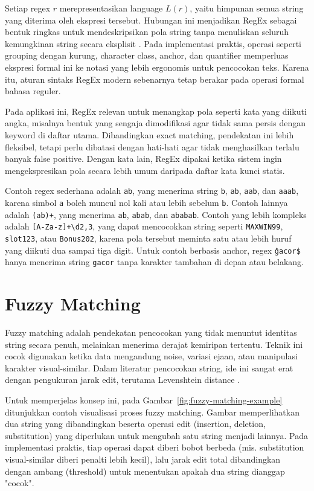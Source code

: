 Setiap regex $r$ merepresentasikan language $L(r)$, yaitu himpunan semua string yang diterima oleh ekspresi tersebut. Hubungan ini menjadikan RegEx sebagai bentuk ringkas untuk mendeskripsikan pola string tanpa menuliskan seluruh kemungkinan string secara eksplisit \cite{hopcroft2006automata,mdnregexp}. Pada implementasi praktis, operasi seperti grouping dengan kurung, character class, anchor, dan quantifier memperluas ekspresi formal ini ke notasi yang lebih ergonomis untuk pencocokan teks. Karena itu, aturan sintaks RegEx modern sebenarnya tetap berakar pada operasi formal bahasa reguler.


Pada aplikasi ini, RegEx relevan untuk menangkap pola seperti kata yang diikuti angka, misalnya bentuk yang sengaja dimodifikasi agar tidak sama persis dengan keyword di daftar utama. Dibandingkan exact matching, pendekatan ini lebih fleksibel, tetapi perlu dibatasi dengan hati-hati agar tidak menghasilkan terlalu banyak false positive. Dengan kata lain, RegEx dipakai ketika sistem ingin mengekspresikan pola secara lebih umum daripada daftar kata kunci statis.

Contoh regex sederhana adalah \texttt{a\*b}, yang menerima string \texttt{b}, \texttt{ab}, \texttt{aab}, dan \texttt{aaab}, karena simbol \texttt{a} boleh muncul nol kali atau lebih sebelum \texttt{b}. Contoh lainnya adalah \texttt{(ab)+}, yang menerima \texttt{ab}, \texttt{abab}, dan \texttt{ababab}. Contoh yang lebih kompleks adalah \texttt{[A-Za-z]+\textbackslash d{2,3}}, yang dapat mencocokkan string seperti \texttt{MAXWIN99}, \texttt{slot123}, atau \texttt{Bonus202}, karena pola tersebut meminta satu atau lebih huruf yang diikuti dua sampai tiga digit. Untuk contoh berbasis anchor, regex \texttt{\^gacor\$} hanya menerima string \texttt{gacor} tanpa karakter tambahan di depan atau belakang.


\section{Fuzzy Matching}

Fuzzy matching adalah pendekatan pencocokan yang tidak menuntut identitas string secara penuh, melainkan menerima derajat kemiripan tertentu. Teknik ini cocok digunakan ketika data mengandung noise, variasi ejaan, atau manipulasi karakter visual-similar. Dalam literatur pencocokan string, ide ini sangat erat dengan pengukuran jarak edit, terutama Levenshtein distance \cite{levenshtein1966binary}.

Untuk memperjelas konsep ini, pada Gambar~\ref{fig:fuzzy-matching-example} ditunjukkan contoh visualisasi proses fuzzy matching. Gambar memperlihatkan dua string yang dibandingkan beserta operasi edit (insertion, deletion, substitution) yang diperlukan untuk mengubah satu string menjadi lainnya. Pada implementasi praktis, tiap operasi dapat diberi bobot berbeda (mis. substitution visual-similar diberi penalti lebih kecil), lalu jarak edit total dibandingkan dengan ambang (threshold) untuk menentukan apakah dua string dianggap "cocok".

